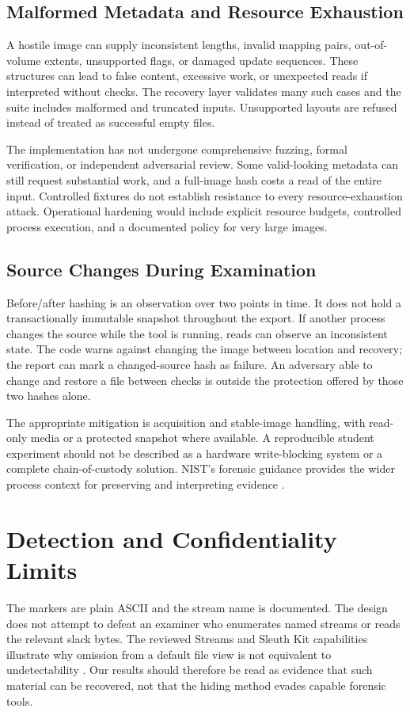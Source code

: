\subsection{Malformed Metadata and Resource Exhaustion}
A hostile image can supply inconsistent lengths, invalid mapping pairs,
out-of-volume extents, unsupported flags, or damaged update sequences. These
structures can lead to false content, excessive work, or unexpected reads if
interpreted without checks. The recovery layer validates many such cases and
the suite includes malformed and truncated inputs. Unsupported layouts are
refused instead of treated as successful empty files.

The implementation has not undergone comprehensive fuzzing, formal
verification, or independent adversarial review. Some valid-looking metadata
can still request substantial work, and a full-image hash costs a read of
the entire input. Controlled fixtures do not establish resistance to every
resource-exhaustion attack. Operational hardening would include explicit
resource budgets, controlled process execution, and a documented policy for
very large images.

\subsection{Source Changes During Examination}
Before/after hashing is an observation over two points in time. It does not
hold a transactionally immutable snapshot throughout the export. If another
process changes the source while the tool is running, reads can observe an
inconsistent state. The code warns against changing the image between
location and recovery; the report can mark a changed-source hash as failure.
An adversary able to change and restore a file between checks is outside the
protection offered by those two hashes alone.

The appropriate mitigation is acquisition and stable-image handling, with
read-only media or a protected snapshot where available. A reproducible
student experiment should not be described as a hardware write-blocking
system or a complete chain-of-custody solution. NIST's forensic guidance
provides the wider process context for preserving and interpreting evidence
\cite{nist86}.

\section{Detection and Confidentiality Limits}
The markers are plain ASCII and the stream name is documented. The design
does not attempt to defeat an examiner who enumerates named streams or reads
the relevant slack bytes. The reviewed Streams and Sleuth Kit capabilities
illustrate why omission from a default file view is not equivalent to
undetectability \cite{sysstreams,icat}. Our results should therefore be read
as evidence that such material can be recovered, not that the hiding method
evades capable forensic tools.

